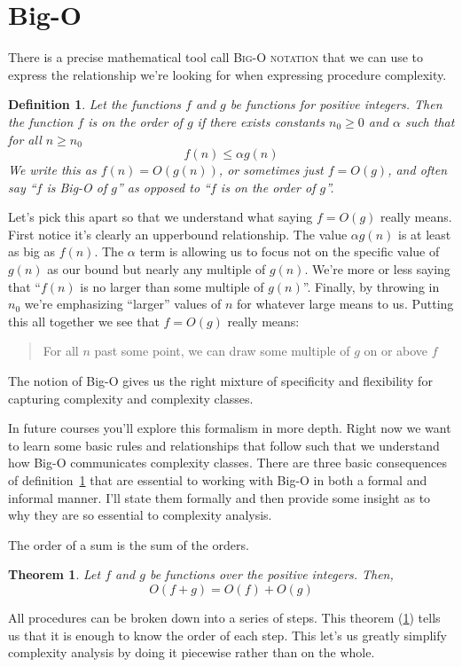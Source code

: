 \documentclass[]{tufte-handout}
\newtheorem{define}{Definition}
\newtheorem{theorem}{Theorem}
\begin{document}
\section{ Big-O }

There is a precise mathematical tool call \textsc{Big-O notation} that we can use to express the relationship we're looking for when expressing procedure complexity.
\begin{define}
Let the functions $f$ and $g$ be functions for positive integers.  Then the function $f$ is \textit{on the order of} $g$ if there exists constants $n_0 \geq 0 $ and $\alpha$ such that for all $n 	\geq n_0$
\[
f(n) \leq \alpha g(n)
\]
We write this as $f(n) = O(g(n))$, or sometimes just $f = O(g)$, and often say ``$f$ is Big-O of $g$'' as opposed to ``$f$ is on the order of $g$''.
\label{def:bigO}
\end{define}

Let's pick this apart so that we understand what saying $f = O(g)$ really means. First notice it's clearly an upperbound relationship. The value $\alpha g(n)$ is at least as big as $f(n)$. The $\alpha$ term is allowing us to focus not on the specific value of $g(n)$ as our bound but nearly any multiple of $g(n)$.  We're more or less saying that ``$f(n)$ is no larger than some multiple of $g(n)$''.  Finally, by throwing in $n_0$ we're emphasizing ``larger'' values of $n$ for whatever large means to us. Putting this all together we see that $f = O(g)$ really means:
\begin{quote}
For all $n$ past some point, we can draw some multiple\sidenote{$\alpha$} of $g$ on or above $f$
\end{quote}
The notion of Big-O gives us the right mixture of specificity and flexibility for capturing complexity and complexity classes.

In future courses you'll explore this formalism in more depth. Right now we want to learn some basic rules and relationships that follow such that we understand how Big-O communicates complexity classes. There are three basic consequences of definition~\ref{def:bigO} that are essential to working with Big-O in both a formal and informal manner. I'll state them formally and then provide some insight as to why they are so essential to complexity analysis.

The order of a sum is the sum of the orders.
\begin{theorem}
Let $f$ and $g$ be functions over the positive integers. Then,
\[
O(f + g) = O(f) + O(g)
\]
\label{th:sum}
\end{theorem}
All procedures can be broken down into a series of steps. This theorem (\ref{th:sum}) tells us that it is enough to know the order of each step. This let's us greatly simplify complexity analysis by doing it piecewise rather than on the whole.
\end{document}
